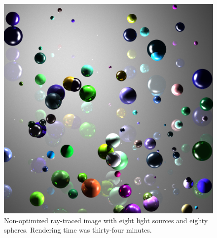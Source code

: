 \begin{figure}[H]
\begin{center}
\includegraphics[scale=0.25]{result1.png} 
\caption{Non-optimized ray-traced image with eight light sources and eighty spheres.  Rendering time was thirty-four minutes.}
\label{result1}
\end{center}
\end{figure}

